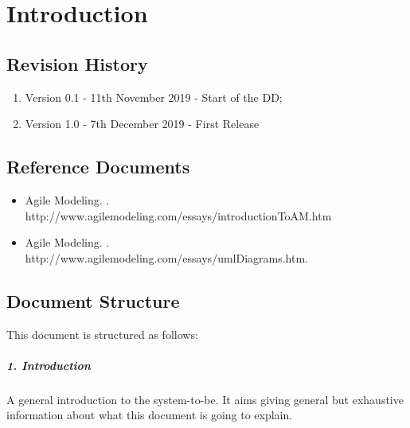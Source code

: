 \documentclass[../DD.tex]{subfiles}
\begin{document}
\chapter{Introduction}
\thispagestyle{fancy}
		
		
		
		
		\section{Revision History}
		\begin{enumerate}
			\item Version 0.1 - 11th November 2019 - Start of the DD;
			
			\item Version 1.0 - 7th December 2019 - First Release
			
		\end{enumerate}
		\section{Reference Documents}
		\begin{itemize}
			\item Agile Modeling. . \\ http://www.agilemodeling.com/essays/introductionToAM.htm
			\item Agile Modeling. . \\ http://www.agilemodeling.com/essays/umlDiagrams.htm.
		\end{itemize}
		\section{Document Structure}
		This document is structured as follows:
		\paragraph{1. Introduction}
		A general introduction to the system-to-be. It aims giving general but exhaustive information about what this document is going to explain.
\end{document}
